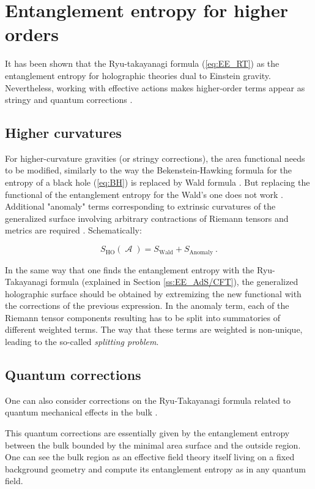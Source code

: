 \documentclass[twocolumn]{revtex4}
\providecommand{\eq}[2]{
    \begin{equation}
        #2
    \label{eq:#1}
    \end{equation}
}
\DeclareMathOperator{\calA}{\mathcal{A}}
\begin{document}
\section{Entanglement entropy for higher orders} \label{s:EE_HO}

It has been shown that the Ryu-takayanagi formula (\ref{eq:EE_RT}) as the entanglement entropy for holographic theories dual to Einstein gravity. Nevertheless, working with effective actions makes higher-order terms appear as stringy and quantum corrections \cite{bueno_holographic_2021}.


\subsection{Higher curvatures} \label{ss:StringyC}

For higher-curvature gravities (or stringy corrections), the area functional needs to be modified, similarly to the way the Bekenstein-Hawking formula for the entropy of a black hole (\ref{eq:BH}) is replaced by Wald formula \cite{iyer_properties_1994}. But replacing the functional of the entanglement entropy for the Wald's one does not work \cite{bueno_holographic_2021}. Additional "anomaly" terms corresponding to extrinsic curvatures of the generalized surface involving arbitrary contractions of Riemann tensors and metrics are required \cite{dong_holographic_2014}. Schematically:
\eq{EE_HO}{
    S_{\text{HO}}(\calA) = S_{\text{Wald}} + S_{\text{Anomaly}} \ .
}

In the same way that one finds the entanglement entropy with the Ryu-Takayanagi formula (explained in Section \ref{ss:EE_AdS/CFT}), the generalized holographic surface should be obtained by extremizing the new functional with the corrections of the previous expression. In the anomaly term, each of the Riemann tensor components resulting has to be split into summatories of different weighted terms. The way that these terms are weighted is non-unique, leading to the so-called \textit{splitting problem}.


\subsection{Quantum corrections} \label{ss:QuantumC}

One can also consider corrections on the Ryu-Takayanagi formula related to quantum mechanical effects in the bulk \cite{faulkner_quantum_2013}.

This quantum corrections are essentially given by the entanglement entropy between the bulk bounded by the minimal area surface and the outside region. One can see the bulk region as an effective field theory itself living on a fixed background geometry and compute its entanglement entropy as in any quantum field.
\end{document}
